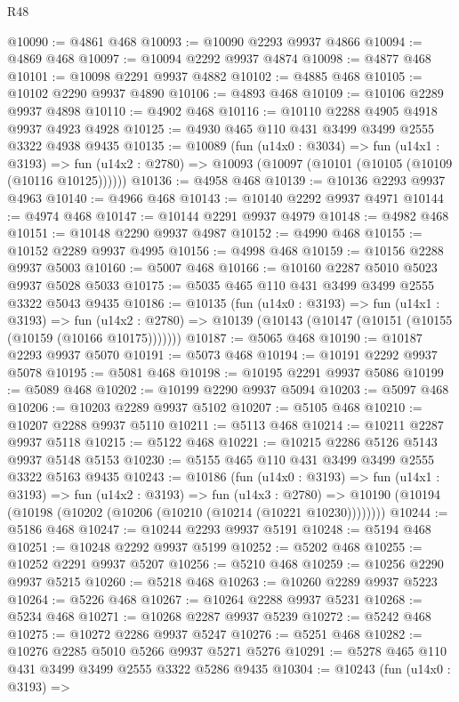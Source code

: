 \begin{lexlean}{R48}
\begin{coremodule}
@10090 := @4861 @468
@10093 := @10090 @2293 @9937 @4866
@10094 := @4869 @468
@10097 := @10094 @2292 @9937 @4874
@10098 := @4877 @468
@10101 := @10098 @2291 @9937 @4882
@10102 := @4885 @468
@10105 := @10102 @2290 @9937 @4890
@10106 := @4893 @468
@10109 := @10106 @2289 @9937 @4898
@10110 := @4902 @468
@10116 := @10110 @2288 @4905 @4918 @9937 @4923 @4928
@10125 := @4930 @465 @110 @431 @3499 @3499 @2555 @3322 @4938 @9435
@10135 := @10089
    (fun (u14x0 : @3034) =>
    fun (u14x1 : @3193) =>
    fun (u14x2 : @2780) => @10093 (@10097 (@10101 (@10105 (@10109 (@10116 @10125))))))
@10136 := @4958 @468
@10139 := @10136 @2293 @9937 @4963
@10140 := @4966 @468
@10143 := @10140 @2292 @9937 @4971
@10144 := @4974 @468
@10147 := @10144 @2291 @9937 @4979
@10148 := @4982 @468
@10151 := @10148 @2290 @9937 @4987
@10152 := @4990 @468
@10155 := @10152 @2289 @9937 @4995
@10156 := @4998 @468
@10159 := @10156 @2288 @9937 @5003
@10160 := @5007 @468
@10166 := @10160 @2287 @5010 @5023 @9937 @5028 @5033
@10175 := @5035 @465 @110 @431 @3499 @3499 @2555 @3322 @5043 @9435
@10186 := @10135
    (fun (u14x0 : @3193) =>
    fun (u14x1 : @3193) =>
    fun (u14x2 : @2780) => @10139 (@10143 (@10147 (@10151 (@10155 (@10159 (@10166 @10175)))))))
@10187 := @5065 @468
@10190 := @10187 @2293 @9937 @5070
@10191 := @5073 @468
@10194 := @10191 @2292 @9937 @5078
@10195 := @5081 @468
@10198 := @10195 @2291 @9937 @5086
@10199 := @5089 @468
@10202 := @10199 @2290 @9937 @5094
@10203 := @5097 @468
@10206 := @10203 @2289 @9937 @5102
@10207 := @5105 @468
@10210 := @10207 @2288 @9937 @5110
@10211 := @5113 @468
@10214 := @10211 @2287 @9937 @5118
@10215 := @5122 @468
@10221 := @10215 @2286 @5126 @5143 @9937 @5148 @5153
@10230 := @5155 @465 @110 @431 @3499 @3499 @2555 @3322 @5163 @9435
@10243 := @10186
    (fun (u14x0 : @3193) =>
    fun (u14x1 : @3193) =>
    fun (u14x2 : @3193) =>
    fun (u14x3 : @2780) =>
    @10190 (@10194 (@10198 (@10202 (@10206 (@10210 (@10214 (@10221 @10230))))))))
@10244 := @5186 @468
@10247 := @10244 @2293 @9937 @5191
@10248 := @5194 @468
@10251 := @10248 @2292 @9937 @5199
@10252 := @5202 @468
@10255 := @10252 @2291 @9937 @5207
@10256 := @5210 @468
@10259 := @10256 @2290 @9937 @5215
@10260 := @5218 @468
@10263 := @10260 @2289 @9937 @5223
@10264 := @5226 @468
@10267 := @10264 @2288 @9937 @5231
@10268 := @5234 @468
@10271 := @10268 @2287 @9937 @5239
@10272 := @5242 @468
@10275 := @10272 @2286 @9937 @5247
@10276 := @5251 @468
@10282 := @10276 @2285 @5010 @5266 @9937 @5271 @5276
@10291 := @5278 @465 @110 @431 @3499 @3499 @2555 @3322 @5286 @9435
@10304 := @10243
    (fun (u14x0 : @3193) =>

\end{coremodule}
\end{lexlean}
